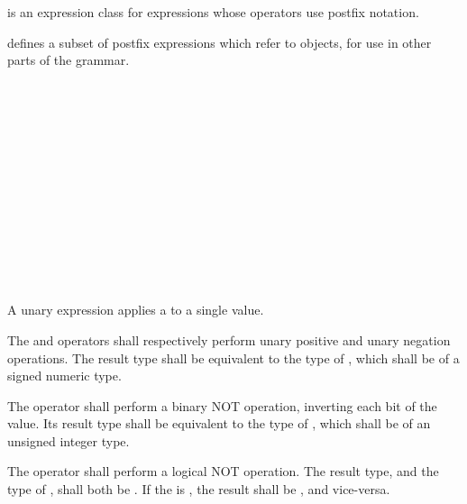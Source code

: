 \specsubsubitem
{} is an expression class for expressions whose
operators use postfix notation.

\specsubsubitem
{} defines a subset of postfix expressions which
refer to objects, for use in other parts of the grammar.


\begin{grammar}
 \\
	 \\
	 \\
	 \\
	 \\
	 \\
\end{grammar}


\begin{grammar}
 \\
	 \\
	  \\
	\terminal{\&}  \\

 \oneof \\
	\terminal{+}
	\terminal{-}
	\terminal{\textasciitilde}
	\terminal{!}
	\terminal{*}
\end{grammar}

\specsubsubitem
A unary expression applies a  to a single value.

\specsubsubitem
The \terminal{+} and \terminal{-} operators shall respectively perform unary
positive and unary negation operations. The result type shall be equivalent to
the type of , which shall be of a signed numeric
type.

\specsubsubitem
The \terminal{\textasciitilde} operator shall perform a binary NOT operation,
inverting each bit of the value. Its result type shall be equivalent to the
type of , which shall be of an unsigned integer
type.

\specsubsubitem
The \terminal{!} operator shall perform a logical NOT operation. The result
type, and the type of , shall both be
. If the  is , the
result shall be , and vice-versa.

